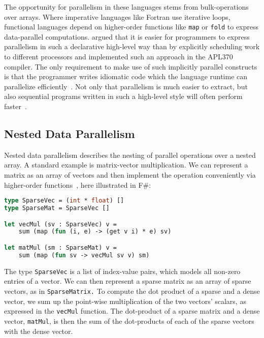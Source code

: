 \documentclass[a4paper]{article}
\begin{document}
The opportunity for parallelism in these languages stems from bulk-operations over arrays. Where imperative languages like Fortran use iterative loops, functional languages depend on higher-order functions like \texttt{map} or \texttt{fold} to express data-parallel computations. \citet{Ching:1990:APA:97808.97826} argued that it is easier for programmers to express parallelism in such a declarative high-level way than by explicitly scheduling work to different processors and implemented such an approach in the APL370 compiler. The only requirement to make use of such implicitly parallel constructs is that the programmer writes idiomatic code which the language runtime can parallelize efficiently~\cite{Bernecky:2015:AEP:2774959.2774962}. Not only that parallelism is much easier to extract, but also sequential programs written in such a high-level style will often perform faster~\cite{Bernecky:2015:AEP:2774959.2774962}.

\subsection{Nested Data Parallelism}
\label{sec:nest-data-parall}

Nested data parallelism describes the nesting of parallel operations over a nested array. A standard example is matrix-vector multiplication. We can represent a matrix as an array of vectors and then implement the operation conveniently via higher-order functions~\cite{Jones2008Harnessing}, here illustrated in F\#:

\begin{lstlisting}[language=ML]
type SparseVec = (int * float) []
type SparseMat = SparseVec []

let vecMul (sv : SparseVec) v =
    sum (map (fun (i, e) -> (get v i) * e) sv)

let matMul (sm : SparseMat) v =
    sum (map (fun sv -> vecMul sv v) sm)
\end{lstlisting}

The type \texttt{SparseVec} is a list of index-value pairs, which models all non-zero entries of a vector. We can then represent a sparse matrix as an array of sparse vectors, as in \texttt{SparseMatrix.} To compute the dot product of a sparse and a dense vector, we sum up the point-wise multiplication of the two vectors' scalars, as expressed in the \texttt{vecMul} function. The dot-product of a sparse matrix and a dense vector, \texttt{matMul}, is then the sum of the dot-products of each of the sparse vectors with the dense vector.
\end{document}
